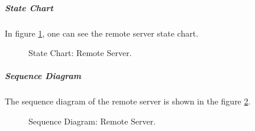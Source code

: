 \subparagraph*{State Chart}
In figure \ref{fig:StateChart_Server}, one can see the remote server state chart.

\begin{figure}[H]
	\centering
	\caption{State Chart: Remote Server.}
	\label{fig:StateChart_Server}
\end{figure}


\subparagraph*{Sequence Diagram}
The sequence diagram of the remote server is shown in the figure \ref{fig:SeqDiagram_Server}. 

\begin{figure}[H]
	\centering
	\caption{Sequence Diagram: Remote Server.}
	\label{fig:SeqDiagram_Server}
\end{figure}
